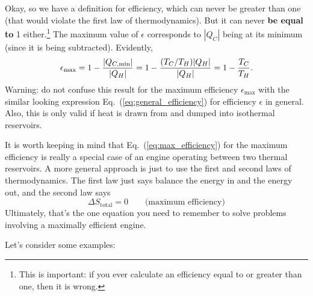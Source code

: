 Okay, so we have a definition for efficiency, which can never be
greater than one (that would violate the first law of thermodynamics).
But it can never {\bf be equal to} 1 either.\footnote{This is
  important: if you ever calculate an efficiency equal to or greater
  than one, then it is wrong.}  The maximum value of $\epsilon$
corresponds to $|Q_C|$ being at its minimum (since it is being subtracted).
Evidently,
\begin{equation}
\epsilon_\text{max} = 1 - \frac{|Q_{C,{\rm min}}|}{|Q_H|} = 1 -
\frac{(T_C/T_H)|Q_H|}{|Q_H|} = 1-\frac{T_C}{T_H}.
\label{eq:max_efficiency}
\end{equation}
Warning: do not confuse this result for the maximum efficiency
$\epsilon_\text{max}$ with the similar looking expression
Eq.~(\ref{eq:general_efficiency}) for efficiency $\epsilon$ in general.
Also, this is only valid if heat is drawn from and dumped into 
isothermal reservoirs.

It is worth keeping in mind that Eq.~(\ref{eq:max_efficiency}) for the
maximum efficiency is really a special case of an engine operating
between two thermal reservoirs.  A more general approach is just to
use the first and second laws of thermodynamics.  The first law just says
balance the energy in and the energy out, and the second law says
%
\begin{equation}
\Delta S_\text{total} = 0 \qquad\text{(maximum efficiency)}
\end{equation}
Ultimately, that's the one equation you need to remember
to solve problems involving a maximally efficient engine.

Let's consider some examples:
\newpage

